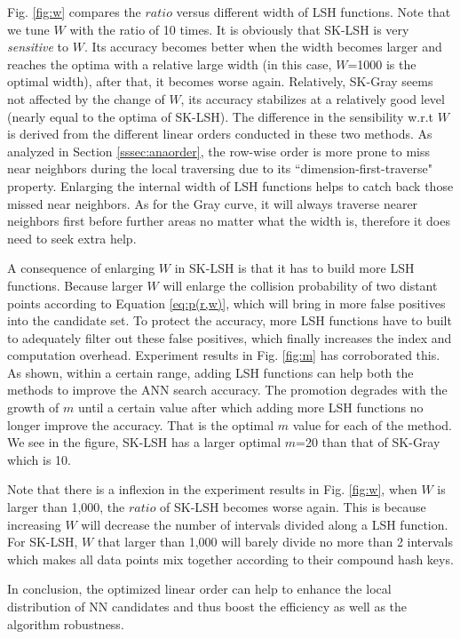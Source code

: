 \documentclass[twocolumn]{svjour3}          %
\begin{document}
Fig. \ref{fig:w} compares the $ratio$ versus different width of LSH functions. Note that we tune $W$ with the ratio of 10 times. It is obviously that SK-LSH is very \emph{sensitive} to $W$. Its accuracy becomes better when the width becomes larger and reaches the optima with a relative large width (in this case, $W$=1000 is the optimal width), after that, it becomes worse again. Relatively, SK-Gray seems not affected by the change of $W$, its accuracy stabilizes at a relatively good level (nearly equal to the optima of SK-LSH). The difference in the sensibility w.r.t $W$ is derived from the different linear orders conducted in these two methods. As analyzed in Section \ref{sssec:anaorder}, the row-wise order is more prone to miss near neighbors during the local traversing due to its ``dimension-first-traverse" property. Enlarging the internal width of LSH functions helps to catch back those missed near neighbors. As for the Gray curve, it will always traverse nearer neighbors first before further areas no matter what the width is, therefore it does need to seek extra help.


A consequence of enlarging $W$ in SK-LSH is that it has to build more LSH functions. Because larger $W$ will enlarge the collision probability of two distant points according to Equation \ref{eq:p(r,w)}, which will bring in more false positives into the candidate set. To protect the accuracy, more LSH functions have to built to adequately filter out these false positives, which finally increases the index and computation overhead. Experiment results in Fig. \ref{fig:m} has corroborated this. As shown, within a certain range, adding LSH functions can help both the methods to improve the ANN search accuracy. The promotion degrades with the growth of $m$ until a certain value after which adding more LSH functions no longer improve the accuracy. That is the optimal $m$ value for each of the method. We see in the figure, SK-LSH has a larger optimal $m$=20 than that of SK-Gray which is 10. 


Note that there is a inflexion in the experiment results in Fig. \ref{fig:w}, when $W$ is larger than 1,000, the $ratio$ of SK-LSH becomes worse again. This is because increasing $W$ will decrease the number of intervals divided along a LSH function. For SK-LSH, $W$ that larger than 1,000 will barely divide no more than 2 intervals which makes all data points mix together according to their compound hash keys.

In conclusion, the optimized linear order can help to enhance the local distribution of NN candidates and thus boost the efficiency as well as the algorithm robustness.
\end{document}
